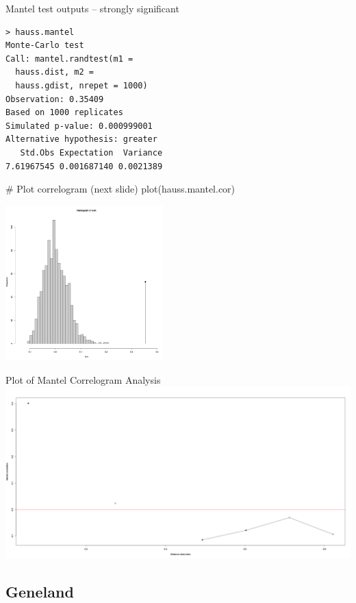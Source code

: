 \documentclass[compress, ucs, xelatex, 11pt, xcolor=svgnames,
  hyperref={
    bookmarks=true,
    unicode=true,
    colorlinks=true,
    pdftitle={Molecular data in R},
    plainpages=false,
    pdfauthor={Vojtech Zeisek},
    pdfsubject={Course about phylogeny and evolution in R},
    pdfcreator={XeLaTeX},
    pdfkeywords={R, evolution, phylogeny, molecular data},
    linkcolor=Tomato,
    anchorcolor=SaddleBrown,
    citecolor=Goldenrod,
    filecolor=DarkMagenta,
    menucolor=Sienna,
    urlcolor=DarkTurquoise,
    pdftex},
  url={hyphens, lowtilde} %
  ]{beamer}
\begin{document}
\begin{frame}[fragile]{Mantel test outputs -- strongly significant}
\begin{multicols}{2}
  \begin{verbatim}
> hauss.mantel
Monte-Carlo test
Call: mantel.randtest(m1 =
  hauss.dist, m2 = 
  hauss.gdist, nrepet = 1000)
Observation: 0.35409
Based on 1000 replicates
Simulated p-value: 0.000999001
Alternative hypothesis: greater
   Std.Obs Expectation  Variance
7.61967545 0.001687140 0.0021389
  \end{verbatim}
  \begin{spluscode}
    # Plot correlogram (next slide)
    plot(hauss.mantel.cor)
  \end{spluscode}
  \includegraphics[height=6cm]{mantel.png}
\end{multicols}
\end{frame}

\begin{frame}{Plot of Mantel Correlogram Analysis}
  \includegraphics[width=\textwidth]{mantel-cor.png}
\end{frame}

\subsection{Geneland}
\end{document}
